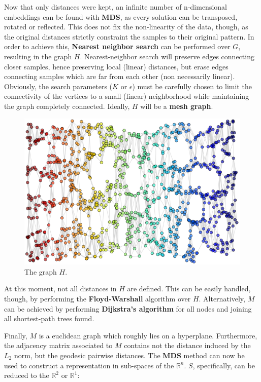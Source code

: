 \documentclass[12pt]{article}
\begin{document}
Now that only distances were kept, an infinite number of n-dimensional embeddings can be found with \textbf{MDS}, as every solution can be transposed, rotated or reflected. This does not fix the non-linearity of the data, though, as the original distances strictly constraint the samples to their original pattern. In order to achieve this, \textbf{Nearest neighbor search} can be performed over $G$, resulting in the graph $H$. Nearest-neighbor search will preserve edges connecting closer samples, hence preserving local (linear) distances, but erase edges connecting samples which are far from each other (non necessarily linear). Obviously, the search parameters ($K$ or $\epsilon$) must be carefully chosen to limit the connectivity of the vertices to a small (linear) neighborhood while maintaining the graph completely connected. Ideally, $H$ will be a \textbf{mesh graph}.

\begin{figure}[H]
	\centering
	\captionsetup{justification=centering}
	\includegraphics[width=.5\linewidth]{mani_s_3}
	\caption{The graph $H$.}
	\label{fig:mani_s_graph_h}
\end{figure}

At this moment, not all distances in $H$ are defined. This can be easily handled, though, by performing the \textbf{Floyd-Warshall} algorithm over $H$. Alternatively, $M$ can be achieved by performing \textbf{Dijkstra's algorithm} for all nodes and joining all shortest-path trees found.

Finally, $M$ is a euclidean graph which roughly lies on a hyperplane. Furthermore, the adjacency matrix associated to $M$ contains not the distance induced by the $L_2$ norm, but the geodesic pairwise distances. \cite{gho2006} The \textbf{MDS} method can now be used to construct a representation in sub-spaces of the $\mathbb{R}^n$. $S$, specifically, can be reduced to the $\mathbb{R}^2$ or $\mathbb{R}^1$:
\end{document}

